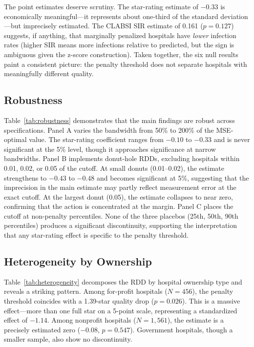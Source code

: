 \documentclass[12pt]{article}
\begin{document}


The point estimates deserve scrutiny. The star-rating estimate of $-0.33$ is economically meaningful---it represents about one-third of the standard deviation---but imprecisely estimated. The CLABSI SIR estimate of 0.161 ($p = 0.127$) suggests, if anything, that marginally penalized hospitals have \textit{lower} infection rates (higher SIR means more infections relative to predicted, but the sign is ambiguous given the z-score construction). Taken together, the six null results paint a consistent picture: the penalty threshold does not separate hospitals with meaningfully different quality.

\subsection{Robustness}

Table~\ref{tab:robustness} demonstrates that the main findings are robust across specifications. Panel A varies the bandwidth from 50\% to 200\% of the MSE-optimal value. The star-rating coefficient ranges from $-0.10$ to $-0.33$ and is never significant at the 5\% level, though it approaches significance at narrow bandwidths. Panel B implements donut-hole RDDs, excluding hospitals within 0.01, 0.02, or 0.05 of the cutoff. At small donuts (0.01--0.02), the estimate strengthens to $-0.43$ to $-0.48$ and becomes significant at 5\%, suggesting that the imprecision in the main estimate may partly reflect measurement error at the exact cutoff. At the largest donut (0.05), the estimate collapses to near zero, confirming that the action is concentrated at the margin. Panel C places the cutoff at non-penalty percentiles. None of the three placebos (25th, 50th, 90th percentiles) produces a significant discontinuity, supporting the interpretation that any star-rating effect is specific to the penalty threshold.



\subsection{Heterogeneity by Ownership}

Table~\ref{tab:heterogeneity} decomposes the RDD by hospital ownership type and reveals a striking pattern. Among for-profit hospitals ($N = 456$), the penalty threshold coincides with a 1.39-star quality drop ($p = 0.026$). This is a massive effect---more than one full star on a 5-point scale, representing a standardized effect of $-1.14$. Among nonprofit hospitals ($N = 1{,}561$), the estimate is a precisely estimated zero ($-0.08$, $p = 0.547$). Government hospitals, though a smaller sample, also show no discontinuity.
\end{document}
